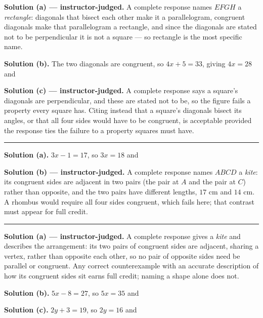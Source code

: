 \documentclass[12pt]{article}
\begin{document}

\noindent\textbf{Solution (a) --- instructor-judged.} A complete response names
$EFGH$ a \emph{rectangle}: diagonals that bisect each other make it a
parallelogram, congruent diagonals make that parallelogram a rectangle, and since
the diagonals are stated not to be perpendicular it is not a square --- so
rectangle is the most specific name.

\noindent\textbf{Solution (b).} The two diagonals are congruent, so
$4x + 5 = 33$, giving $4x = 28$ and 

\noindent\textbf{Solution (c) --- instructor-judged.} A complete response says a
square's diagonals are perpendicular, and these are stated not to be, so the
figure fails a property every square has. Citing instead that a square's
diagonals bisect its angles, or that all four sides would have to be congruent,
is acceptable provided the response ties the failure to a property squares must
have.

\vspace{0.15cm}\noindent\rule{\linewidth}{0.2pt}


\noindent\textbf{Solution (a).} $3x - 1 = 17$, so $3x = 18$ and 

\noindent\textbf{Solution (b) --- instructor-judged.} A complete response names
$ABCD$ a \emph{kite}: its congruent sides are adjacent in two pairs (the pair at
$A$ and the pair at $C$) rather than opposite, and the two pairs have different
lengths, $17$ cm and $14$ cm. A rhombus would require all four sides congruent,
which fails here; that contrast must appear for full credit.

\vspace{0.15cm}\noindent\rule{\linewidth}{0.2pt}


\noindent\textbf{Solution (a) --- instructor-judged.} A complete response gives a
\emph{kite} and describes the arrangement: its two pairs of congruent sides are
adjacent, sharing a vertex, rather than opposite each other, so no pair of
opposite sides need be parallel or congruent. Any correct counterexample with an
accurate description of how its congruent sides sit earns full credit; naming a
shape alone does not.

\noindent\textbf{Solution (b).} $5x - 8 = 27$, so $5x = 35$ and 

\noindent\textbf{Solution (c).} $2y + 3 = 19$, so $2y = 16$ and 
\end{document}
